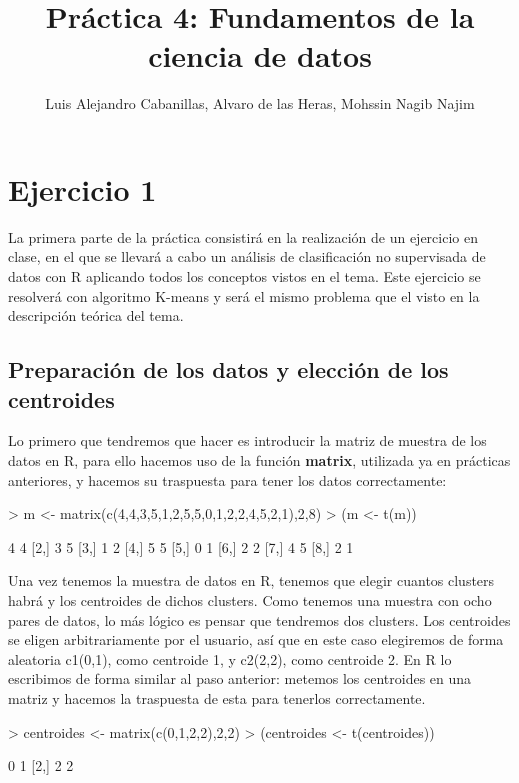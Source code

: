 \documentclass[a4paper]{article}
\title{\textbf{Práctica 4: Fundamentos de la ciencia de datos}}
\author{Luis Alejandro Cabanillas, Alvaro de las Heras, Mohssin Nagib Najim}
\begin{document}



\maketitle

\section{Ejercicio 1}La primera parte de la práctica consistirá en la realización de un ejercicio en clase, en el que se llevará a cabo un análisis de clasificación no supervisada de datos con R aplicando todos los conceptos vistos en el tema. Este ejercicio se resolverá con algoritmo K-means y será el mismo problema que el visto en la descripción teórica del tema.

\subsection{Preparación de los datos y elección de los centroides}Lo primero que tendremos que hacer es introducir la matriz de muestra de los datos en R, para ello hacemos uso de la función \textbf{matrix}, utilizada ya en prácticas anteriores, y hacemos su traspuesta para tener los datos correctamente:

\begin{Schunk}
\begin{Sinput}
> m <- matrix(c(4,4,3,5,1,2,5,5,0,1,2,2,4,5,2,1),2,8)
> (m <- t(m))
\end{Sinput}
\begin{Soutput}
     [,1] [,2]
[1,]    4    4
[2,]    3    5
[3,]    1    2
[4,]    5    5
[5,]    0    1
[6,]    2    2
[7,]    4    5
[8,]    2    1
\end{Soutput}
\end{Schunk}

Una vez tenemos la muestra de datos en R, tenemos que elegir cuantos clusters habrá y los centroides de dichos clusters. Como tenemos una muestra con ocho pares de datos, lo más lógico es pensar que tendremos dos clusters. Los centroides se eligen arbitrariamente por el usuario, así que en este caso elegiremos de forma aleatoria c1(0,1), como centroide 1, y c2(2,2), como centroide 2. En R lo escribimos de forma similar al paso anterior: metemos los centroides en una matriz y hacemos la traspuesta de esta para tenerlos correctamente.

\begin{Schunk}
\begin{Sinput}
> centroides <- matrix(c(0,1,2,2),2,2)
> (centroides <- t(centroides))
\end{Sinput}
\begin{Soutput}
     [,1] [,2]
[1,]    0    1
[2,]    2    2
\end{Soutput}
\end{Schunk}
\end{document}
